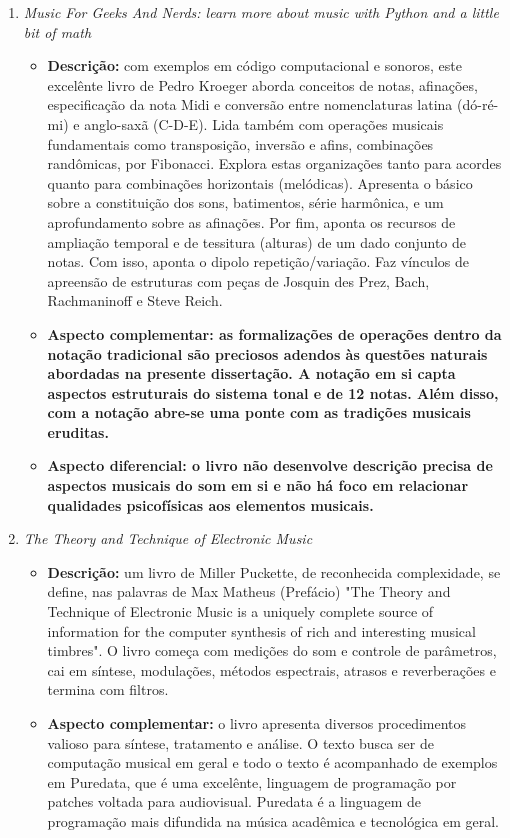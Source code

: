 \begin{enumerate}
    \item \emph{Music For Geeks And Nerds: learn more about music with Python and a little bit of math}
        \begin{itemize}
            \item {\bf Descrição:} com exemplos em código computacional e sonoros, este excelênte livro de Pedro Kroeger aborda conceitos de notas, afinações, especificação da nota Midi e conversão entre nomenclaturas latina (dó-ré-mi) e anglo-saxã (C-D-E). Lida também com operações musicais fundamentais como transposição, inversão e afins, combinações randômicas, por Fibonacci. Explora estas organizações tanto para acordes quanto para combinações horizontais (melódicas). Apresenta o básico sobre a constituição dos sons, batimentos, série harmônica, e um aprofundamento sobre as afinações. Por fim, aponta os recursos de ampliação temporal e de tessitura (alturas) de um dado conjunto de notas. Com isso, aponta o dipolo repetição/variação. Faz vínculos de apreensão de estruturas com peças de Josquin des Prez, Bach, Rachmaninoff e Steve Reich.
            \item {\bf Aspecto complementar: as formalizações de operações dentro da notação tradicional são preciosos adendos às questões naturais abordadas na presente dissertação. A notação em si capta aspectos estruturais do sistema tonal e de 12 notas. Além disso, com a notação abre-se uma ponte com as tradições musicais eruditas.}
            \item {\bf Aspecto diferencial: o livro não desenvolve descrição precisa de aspectos musicais do som em si e não há foco em relacionar qualidades psicofísicas aos elementos musicais.}
        \end{itemize}
    \item  \emph{The Theory and Technique of Electronic Music}
        \begin{itemize}
            \item {\bf Descrição:} um livro de Miller Puckette, de reconhecida complexidade, se define, nas palavras de Max Matheus (Prefácio) "The Theory and Technique of Electronic Music is a uniquely complete source of information for the computer synthesis of rich and interesting musical timbres". O livro começa com medições do som e controle de parâmetros, cai em síntese, modulações, métodos espectrais, atrasos e reverberações e termina com filtros.
            \item {\bf Aspecto complementar:} o livro apresenta diversos procedimentos valioso para síntese, tratamento e análise. O texto busca ser de computação musical em geral e todo o texto é acompanhado de exemplos em Puredata, que é uma excelênte, linguagem de programação por patches voltada para audiovisual. Puredata é a linguagem de programação mais difundida na música acadêmica e tecnológica em geral.

\end{itemize}
\end{enumerate}
